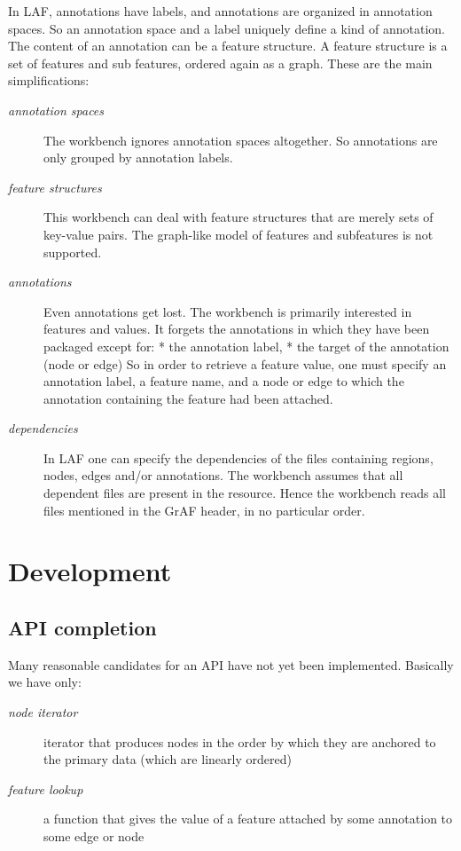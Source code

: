 \documentclass[letterpaper,10pt,english]{sphinxmanual}
\begin{document}
In LAF, annotations have labels, and annotations are organized in annotation spaces.
So an annotation space and a label uniquely define a kind of annotation.
The content of an annotation can be a feature structure.
A feature structure is a set of features and sub features, ordered again as a graph.
These are the main simplifications:
\begin{description}
\item[{\emph{annotation spaces}}] \leavevmode
The workbench ignores annotation spaces altogether.
So annotations are only grouped by annotation labels.

\item[{\emph{feature structures}}] \leavevmode
This workbench can deal with feature structures that are merely sets of key-value pairs.
The graph-like model of features and subfeatures is not supported.

\item[{\emph{annotations}}] \leavevmode
Even annotations get lost. The workbench is primarily interested in features and values.
It forgets the annotations in which they have been packaged except for:
* the annotation label,
* the target of the annotation (node or edge)
So in order to retrieve a feature value, one must specify
an annotation label, a feature name, and a node or edge
to which the annotation containing the feature had been attached.

\item[{\emph{dependencies}}] \leavevmode
In LAF one can specify the dependencies of the files containing regions, nodes, edges and/or annotations.
The workbench assumes that all dependent files are present in the resource.
Hence the workbench reads all files mentioned in the GrAF header, in no particular order.

\end{description}


\section{Development}
\label{workbench:development}

\subsection{API completion}
\label{workbench:api-completion}
Many reasonable candidates for an API have not yet been implemented. Basically we have only:
\begin{description}
\item[{\emph{node iterator}}] \leavevmode
iterator that produces nodes in the order by which they are anchored to the primary data (which are linearly ordered)

\item[{\emph{feature lookup}}] \leavevmode
a function that gives the value of a feature attached by some annotation to some edge or node

\end{description}
\end{document}

